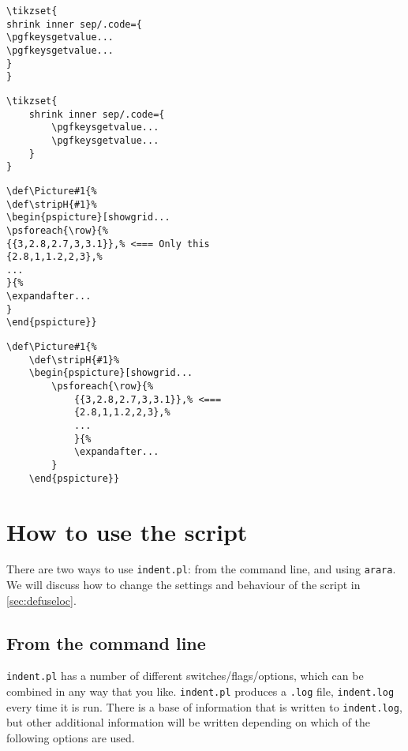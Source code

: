 \begin{adjustwidth}{-2cm}{2cm}
 	\begin{minipage}{.5\textwidth}
 		\begin{lstlisting}[style=demo,caption={\lstinline!tikzset! before}]
\tikzset{
shrink inner sep/.code={
\pgfkeysgetvalue...
\pgfkeysgetvalue...
}
}
 		\end{lstlisting}
 	\end{minipage}%
 	\begin{minipage}{.5\textwidth}
 		\begin{lstlisting}[style=demo,caption={\lstinline!tikzset! after}]
\tikzset{
	shrink inner sep/.code={
		\pgfkeysgetvalue...
		\pgfkeysgetvalue...
	}
}
 		\end{lstlisting}
 	\end{minipage}
 	\begin{minipage}{.5\textwidth}
 		\begin{lstlisting}[style=demo,caption={\lstinline!pstricks! before}]
\def\Picture#1{%
\def\stripH{#1}%
\begin{pspicture}[showgrid...
\psforeach{\row}{%
{{3,2.8,2.7,3,3.1}},% <=== Only this 
{2.8,1,1.2,2,3},%
...
}{%
\expandafter...
}
\end{pspicture}}
 		\end{lstlisting}
 	\end{minipage}%
 	\begin{minipage}{.5\textwidth}
 		\begin{lstlisting}[style=demo,caption={\lstinline!pstricks! after},label={lst:pstricksafter}]
\def\Picture#1{%
	\def\stripH{#1}%
	\begin{pspicture}[showgrid...
		\psforeach{\row}{%
			{{3,2.8,2.7,3,3.1}},% <=== 
			{2.8,1,1.2,2,3},%
            ...
			}{%
			\expandafter...
		}
	\end{pspicture}}
 		\end{lstlisting}
 	\end{minipage}
 \end{adjustwidth}
  
\section{How to use the script}
 There are two ways to use \lstinline!indent.pl!: from the command line, 
 and using \lstinline!arara!.  We will discuss how to change the settings and behaviour 
 of the script in \cref{sec:defuseloc}.
  
 \subsection{From the command line}\label{sec:commandline}
 	\lstinline!indent.pl! has a number of different switches/flags/options, which 
 	can be combined in any way that you like. \lstinline!indent.pl! 
 	produces a \lstinline!.log! file, \lstinline!indent.log! every time it
 	is run. There is a base of information that is written to \lstinline!indent.log!,
 	but other additional information will be written depending 
 	on which of the following options are used.
 	 	
